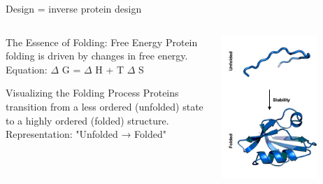 \documentclass[presentation,smaller]{beamer}
\begin{document}
\begin{frame}[label={sec:orgda8a171}]{Design = inverse protein design}
\begin{columns}
\begin{column}{0.5\columnwidth}
\begin{block}{The Essence of Folding: Free Energy}
Protein folding is driven by changes in free energy.
Equation: \(\Delta\) G = \(\Delta\) H + T \(\Delta\) S
\end{block}

\begin{block}{Visualizing the Folding Process}
Proteins transition from a less ordered (unfolded) state to a highly ordered
(folded) structure. Representation: "Unfolded → Folded"
\end{block}
\end{column}

\begin{column}{0.5\columnwidth}
\begin{center}
\includegraphics[width=0.7\textwidth]{./img/s1_f3.png}
\end{center}
\end{column}
\end{columns}
\end{frame}
\end{document}
